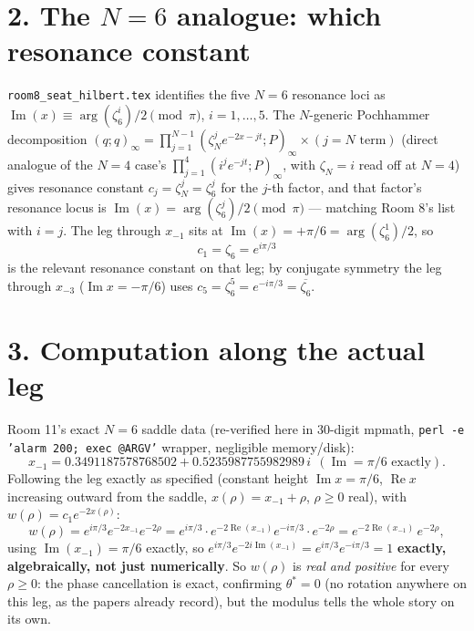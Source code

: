\documentclass[11pt]{article}
\begin{document}
\section*{2. The $N=6$ analogue: which resonance constant}

\texttt{room8\_seat\_hilbert.tex} identifies the five $N=6$ resonance loci as
$\operatorname{Im}(x)\equiv\arg(\zeta_6^i)/2\pmod\pi$, $i=1,\ldots,5$. The $N$-generic Pochhammer
decomposition $(q;q)_\infty=\prod_{j=1}^{N-1}(\zeta_N^je^{-2x-jt};P)_\infty\times(j=N\text{ term})$
(direct analogue of the $N=4$ case's $\prod_{j=1}^4(i^je^{-jt};P)_\infty$, with $\zeta_N=i$ read off
at $N=4$) gives resonance constant $c_j=\zeta_N^j=\zeta_6^j$ for the $j$-th factor, and that factor's
resonance locus is $\operatorname{Im}(x)=\arg(\zeta_6^j)/2\pmod\pi$ --- matching Room 8's list with
$i=j$. The leg through $x_{-1}$ sits at $\operatorname{Im}(x)=+\pi/6=\arg(\zeta_6^1)/2$, so
\[
   c_1=\zeta_6=e^{i\pi/3}
\]
is the relevant resonance constant on that leg; by conjugate symmetry the leg through $x_{-3}$
($\operatorname{Im}x=-\pi/6$) uses $c_5=\zeta_6^5=e^{-i\pi/3}=\overline{\zeta_6}$.

\section*{3. Computation along the actual leg}

Room 11's exact $N=6$ saddle data (re-verified here in 30-digit mpmath, \texttt{perl -e 'alarm 200;
exec @ARGV'} wrapper, negligible memory/disk):
\[
   x_{-1}=0.3491187578768502+0.5235987755982989\,i\ \ (\operatorname{Im}=\pi/6\text{ exactly}).
\]
Following the leg exactly as specified (constant height $\operatorname{Im}x=\pi/6$, $\operatorname{Re}x$
increasing outward from the saddle, $x(\rho)=x_{-1}+\rho$, $\rho\ge0$ real), with
$w(\rho)=c_1e^{-2x(\rho)}$:
\[
   w(\rho)=e^{i\pi/3}e^{-2x_{-1}}e^{-2\rho}
          =e^{i\pi/3}\cdot e^{-2\operatorname{Re}(x_{-1})}e^{-i\pi/3}\cdot e^{-2\rho}
          =e^{-2\operatorname{Re}(x_{-1})}\,e^{-2\rho},
\]
using $\operatorname{Im}(x_{-1})=\pi/6$ exactly, so $e^{i\pi/3}e^{-2i\operatorname{Im}(x_{-1})}
=e^{i\pi/3}e^{-i\pi/3}=1$ \textbf{exactly, algebraically, not just numerically}. So $w(\rho)$ is
\emph{real and positive} for every $\rho\ge0$: the phase cancellation is exact, confirming
$\theta^\ast=0$ (no rotation anywhere on this leg, as the papers already record), but the modulus
tells the whole story on its own.
\end{document}

